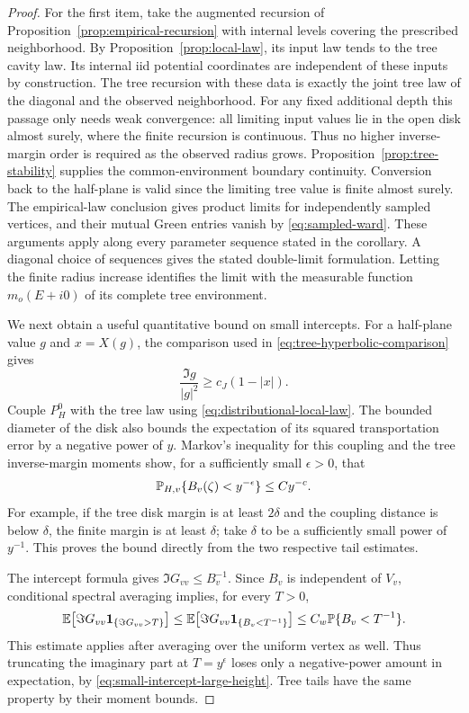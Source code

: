 \begin{proof}
For the first item, take the augmented recursion of
Proposition~\ref{prop:empirical-recursion} with internal levels covering
the prescribed neighborhood.  By Proposition~\ref{prop:local-law},
its input law tends to the tree cavity law.  Its internal iid potential
coordinates are independent of these inputs by construction.
The tree recursion with these data is exactly the joint tree law of
the diagonal and the observed neighborhood.  For any fixed additional
depth this passage only needs weak convergence: all limiting input
values lie in the open disk almost surely, where the finite recursion
is continuous.  Thus no higher inverse-margin order is required as the
observed radius grows.  Proposition~\ref{prop:tree-stability} supplies
the common-environment boundary continuity.  Conversion back to the
half-plane is valid since the limiting tree value is finite almost
surely.  The empirical-law conclusion gives product limits for
independently sampled vertices, and their mutual Green entries vanish
by \eqref{eq:sampled-ward}.  These arguments apply along every parameter
sequence stated in the corollary.  A diagonal choice of sequences gives
the stated double-limit formulation.  Letting the finite radius
increase identifies the limit with the measurable function
$m_o(E+i0)$ of its complete tree environment.

We next obtain a useful quantitative bound on small intercepts.
For a half-plane value $g$ and $x=X(g)$, the comparison used in
\eqref{eq:tree-hyperbolic-comparison} gives
\[
 \frac{\Im g}{|g|^2}\ge c_J(1-|x|).
\]
Couple $P_H^0$ with the tree law using
\eqref{eq:distributional-local-law}.  The bounded diameter of the disk
also bounds the expectation of its squared transportation error by
a negative power of $y$.  Markov's inequality for this coupling and
the tree inverse-margin moments show, for a sufficiently small
$\epsilon>0$, that
\begin{equation}\label{eq:small-intercept-large-height}
 \mathbb P_{H,v}\{B_v(\zeta)<y^{-\epsilon}\}\le Cy^{-c}.
\end{equation}
For example, if the tree disk margin is at least $2\delta$ and the
coupling distance is below $\delta$, the finite margin is at least
$\delta$; take $\delta$ to be a sufficiently small power of $y^{-1}$.
This proves the bound directly from the two respective tail estimates.

The intercept formula gives $\Im G_{vv}\le B_v^{-1}$.
Since $B_v$ is independent of $V_v$, conditional spectral averaging
implies, for every $T>0$,
\begin{equation}\label{eq:intercept-tail-mean}
 \mathbb E\bigl[\Im G_{vv}\mathbf1_{\{\Im G_{vv}>T\}}\bigr]
 \le \mathbb E\bigl[\Im G_{vv}\mathbf1_{\{B_v<T^{-1}\}}\bigr]
 \le C_w\mathbb P\{B_v<T^{-1}\}.
\end{equation}
This estimate applies after averaging over the uniform vertex as well.
Thus truncating the imaginary part at $T=y^\epsilon$ loses only a
negative-power amount in expectation, by
\eqref{eq:small-intercept-large-height}.  Tree tails have the same
property by their moment bounds.


\end{proof}
